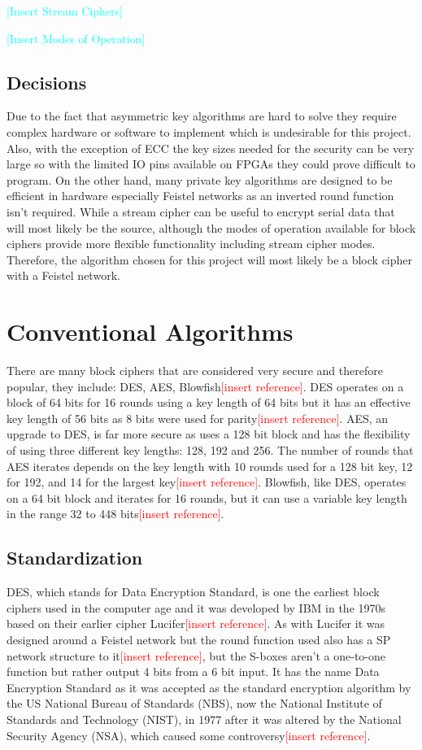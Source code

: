 \documentclass[12pt,twoside,a4paper]{report}
\begin{document}
    \textcolor{cyan}{[Insert Stream Ciphers]}
    
    \textcolor{cyan}{[Insert Modes of Operation]}
    
    \subsection{Decisions}
    Due to the fact that asymmetric key algorithms are hard to solve they require complex hardware or software to implement which is undesirable for this project. Also, with the exception of ECC the key sizes needed for the security can be very large so with the limited IO pins available on FPGAs they could prove difficult to program. On the other hand, many private key algorithms are designed to be efficient in hardware especially Feistel networks as an inverted round function isn't required. While a stream cipher can be useful to encrypt serial data that will most likely be the source, although the modes of operation available for block ciphers provide more flexible functionality including stream cipher modes. Therefore, the algorithm chosen for this project will most likely be a block cipher with a Feistel network.
    
    \section{Conventional Algorithms}
    There are many block ciphers that are considered very secure and therefore popular, they include: DES, AES, Blowfish\textcolor{red}{[insert reference]}. DES operates on a block of 64 bits for 16 rounds using a key length of 64 bits but it has an effective key length of 56 bits as 8 bits were used for parity\textcolor{red}{[insert reference]}. AES, an upgrade to DES, is far more secure as uses a 128 bit block and has the flexibility of using three different key lengths: 128, 192 and 256. The number of rounds that AES iterates depends on the key length with 10 rounds used for a 128 bit key, 12 for 192, and 14 for the largest key\textcolor{red}{[insert reference]}. Blowfish, like DES, operates on a 64 bit block and iterates for 16 rounds, but it can use a variable key length in the range 32 to 448 bits\textcolor{red}{[insert reference]}.
    
    \subsection{Standardization}
    DES, which stands for Data Encryption Standard, is one the earliest block ciphers used in the computer age and it was developed by IBM in the 1970s based on their earlier cipher Lucifer\textcolor{red}{[insert reference]}. As with Lucifer it was designed around a Feistel network but the round function used also has a SP network structure to it\textcolor{red}{[insert reference]}, but the S-boxes aren't a one-to-one function but rather output 4 bits from a 6 bit input. It has the name Data Encryption Standard as it was accepted as the standard encryption algorithm by the US National Bureau of Standards (NBS), now the National Institute of Standards and Technology (NIST), in 1977 after it was altered by the National Security Agency (NSA), which caused some controversy\textcolor{red}{[insert reference]}.
    
\end{document}

